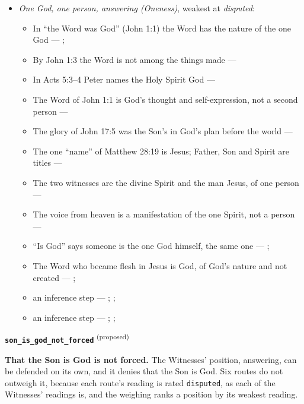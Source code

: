 \documentclass[11pt,paper=\testimonypaper,DIV=13,parskip=false]{scrartcl}
\begin{document}
\begin{itemize}
\item \emph{One God, one person, answering (Oneness)}, weakest at \emph{disputed}:
\begin{itemize}
\item In “the Word was God” (John 1:1) the Word has the nature of the one God --- \cite{harner-qualitative-anarthrous-1973}; \cite[3, The Triune God]{kibbey-living-systematic-theology-2026}
\item By John 1:3 the Word is not among the things made --- \cite[Tractates on John I.11]{schaff-nicene-post-nicene-fathers-1-7}
\item In Acts 5:3–4 Peter names the Holy Spirit God --- \cite[198]{calvin-commentary-acts-1844}
\item The Word of John 1:1 is God’s thought and self-expression, not a second person --- \cite[ch. 4 and 8, on John 1:1]{bernard-oneness-of-god-1983}
\item The glory of John 17:5 was the Son’s in God’s plan before the world --- \cite[ch. 8, The Preexistence of Jesus]{bernard-oneness-of-god-1983}
\item The one “name” of Matthew 28:19 is Jesus; Father, Son and Spirit are titles --- \cite[ch. 6, Matthew 28:19]{bernard-oneness-of-god-1983}
\item The two witnesses are the divine Spirit and the man Jesus, of one person --- \cite[ch. 8, Two Witnesses]{bernard-oneness-of-god-1983}
\item The voice from heaven is a manifestation of the one Spirit, not a person --- \cite[ch. 8, The Voice from Heaven]{bernard-oneness-of-god-1983}
\item “Is God” says someone is the one God himself, the same one --- \cite[ch. 8, Are Jesus and the Father One in Purpose Only?]{bernard-oneness-of-god-1983}; \cite[27]{watchtower-should-you-believe-trinity-1989}
\item The Word who became flesh in Jesus is God, of God’s nature and not created --- \cite[3, The Triune God]{kibbey-living-systematic-theology-2026}; \cite[ch. 4, Conclusion]{bernard-oneness-of-god-1983}
\item an inference step --- \cite[3, The Triune God]{kibbey-living-systematic-theology-2026}; \cite[ch. 4, Conclusion]{bernard-oneness-of-god-1983}; \cite[17--19]{buzzard-caveat-lector-2001}
\item an inference step --- \cite[ch. 8, Are Jesus and the Father One in Purpose Only?]{bernard-oneness-of-god-1983}; \cite[27]{watchtower-should-you-believe-trinity-1989}; \cite[I, q. 28, a. 3]{aquinas-summa-1920}
\end{itemize}
\end{itemize}
\par\medskip\noindent\textbf{\texttt{son\_\allowbreak{}is\_\allowbreak{}god\_\allowbreak{}not\_\allowbreak{}forced}} \textsuperscript{(proposed)}\par\nobreak\noindent
\textbf{That the Son is God is not forced.} The Witnesses’ position, answering, can be defended on its own, and it denies that the Son is God. Six routes do not outweigh it, because each route’s reading is rated \texttt{disputed}, as each of the Witnesses’ readings is, and the weighing ranks a position by its weakest reading.
\end{document}
